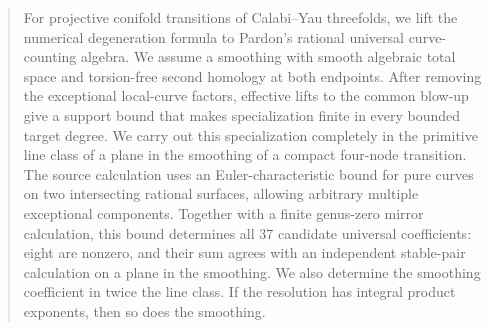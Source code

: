 \begin{abstract}
For projective conifold transitions of Calabi--Yau threefolds, we lift
the numerical degeneration formula to Pardon's rational universal
curve-counting algebra. We assume a smoothing with smooth algebraic
total space and torsion-free second homology at both endpoints.
After removing the exceptional local-curve factors, effective lifts
to the common blow-up give a support bound that makes specialization
finite in every bounded target degree. We carry out this
specialization completely in the primitive line class of a plane
in the smoothing of a compact four-node transition. The source calculation uses an
Euler-characteristic bound for pure curves on two intersecting rational
surfaces, allowing arbitrary multiple exceptional components.
Together with a finite genus-zero mirror calculation, this bound
determines all 37 candidate universal coefficients: eight are
nonzero, and their sum agrees with an independent stable-pair
calculation on a plane in the smoothing. We also determine the
smoothing coefficient in twice the line class. If the resolution has
integral product exponents, then so does the smoothing.
\end{abstract}
